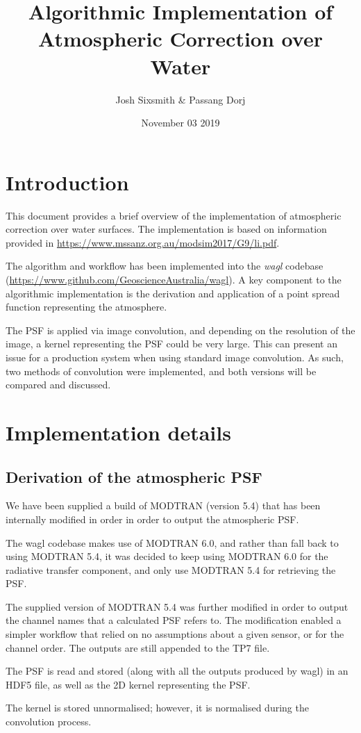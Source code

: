 \documentclass[a4paper]{article}
\title{Algorithmic Implementation of Atmospheric Correction over Water}
\date{November 03 2019}
\author{Josh Sixsmith \& Passang Dorj}
\begin{document}
  \maketitle
  \newpage

  \section{Introduction}

    \begin{flushleft}
      This document provides a brief overview of the implementation of atmospheric correction over water surfaces. The implementation is based on information provided in \url{https://www.mssanz.org.au/modsim2017/G9/li.pdf}. \par
      The algorithm and workflow has been implemented into the \textit{wagl} codebase (\url{https://www.github.com/GeoscienceAustralia/wagl}). A key component to the algorithmic implementation is the derivation and application of a point spread function representing the atmosphere. \par
      The PSF is applied via image convolution, and depending on the resolution of the image, a kernel representing the PSF could be very large. This can present an issue for a production system when using standard image convolution. As such, two methods of convolution were implemented, and both versions will be compared and discussed.
    \end{flushleft}

  \section{Implementation details}

  \subsection{Derivation of the atmospheric PSF}

    \begin{flushleft}
      We have been supplied a build of MODTRAN (version 5.4) that has been internally modified in order in order to output the atmospheric PSF. \par
      The wagl codebase makes use of MODTRAN 6.0, and rather than fall back to using MODTRAN 5.4, it was decided to keep using MODTRAN 6.0 for the radiative transfer component, and only use MODTRAN 5.4 for retrieving the PSF. \par
      The supplied version of MODTRAN 5.4 was further modified in order to output the channel names that a calculated PSF refers to. The modification enabled a simpler workflow that relied on no assumptions about a given sensor, or for the channel order. The outputs are still appended to the TP7 file. \par
      The PSF is read and stored (along with all the outputs produced by wagl) in an HDF5 file, as well as the 2D kernel representing the PSF. \par
      The kernel is stored unnormalised; however, it is normalised during the convolution process.
    \end{flushleft}
\end{document}
